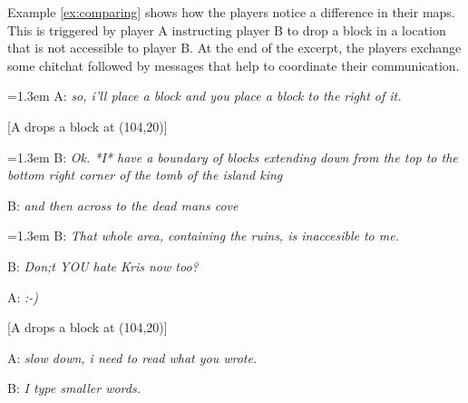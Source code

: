 Example \ref{ex:comparing} shows how the players notice a difference
in their maps. This is triggered by player A instructing player B to
drop a block in a location that is not accessible to player B.
At the end of the excerpt, the players exchange some chitchat followed
by messages that help to coordinate their communication.

{\footnotesize
\begin{example}
\parbox[t]{0.9\columnwidth}{
\hangindent=1.3em A: \textit{so, i'll place a block and you place a block to the right of it.}

[A drops a block at (104,20)]

\hangindent=1.3em B: \textit{Ok. *I* have a boundary of blocks extending down from the top to the bottom right corner of  the tomb of the island king}

B: \textit{and then across to the dead mans cove}

\hangindent=1.3em B: \textit{That whole area, containing the ruins, is inaccesible to me.}

B: \textit{Don;t YOU hate Kris now too?}

A: \textit{:-)}

[A drops a block at (104,20)]

A: \textit{slow down, i need to read what you wrote.}

B: \textit{I type smaller words.}
}
\label{ex:comparing}
\end{example}
}
